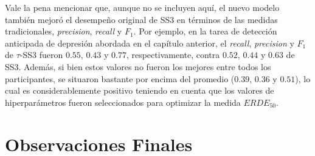 Vale la pena mencionar que, aunque no se incluyen aquí, el nuevo modelo también mejoró el desempeño original de SS3 en términos de las medidas tradicionales, \emph{precision}, \emph{recall} y $F_1$.
Por ejemplo, en la tarea de detección anticipada de depresión abordada en el capítulo anterior, el \emph{recall}, \emph{precision} y $F_1$ de $\tau$-SS3 fueron $0.55$, $0.43$ y $0.77$, respectivamente, contra $0.52$, $0.44$ y $0.63$ de SS3.
Además, si bien estos valores no fueron los mejores entre todos los participantes, se situaron bastante por encima del promedio ($0.39$, $0.36$ y $0.51$), lo cual es considerablemente positivo teniendo en cuenta que los valores de hiperparámetros fueron seleccionados para optimizar la medida $ERDE_{50}$.

\section{Observaciones Finales}

